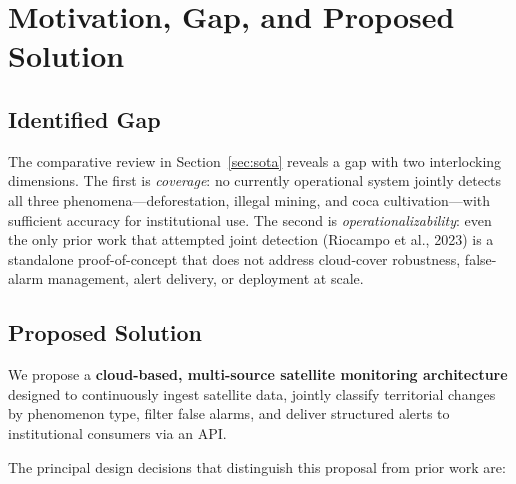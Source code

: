 \documentclass{article}
\begin{document}
\section{Motivation, Gap, and Proposed Solution}
\label{sec:gap}

\subsection{Identified Gap}

The comparative review in Section~\ref{sec:sota} reveals a gap with two
interlocking dimensions.
The first is \textit{coverage}: no currently operational system jointly detects
all three phenomena---deforestation, illegal mining, and coca cultivation---with
sufficient accuracy for institutional use.
The second is \textit{operationalizability}: even the only prior work that
attempted joint detection (Riocampo et al., 2023) is a standalone
proof-of-concept that does not address cloud-cover robustness, false-alarm
management, alert delivery, or deployment at scale.

\subsection{Proposed Solution}

We propose a \textbf{cloud-based, multi-source satellite monitoring architecture}
designed to continuously ingest satellite data, jointly classify territorial
changes by phenomenon type, filter false alarms, and deliver structured alerts
to institutional consumers via an API.

The principal design decisions that distinguish this proposal from prior work are:
\end{document}
